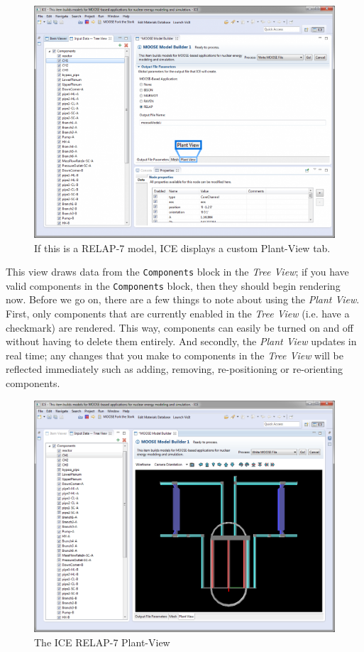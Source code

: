 \begin{figure}[htbp]
\centering
\includegraphics[width=\textwidth]{figures/ICE_MOOSEPlantViewTab.png}
\caption{If this is a RELAP-7 model, ICE displays a custom Plant-View tab.}
\end{figure}

This view draws data from the \texttt{Components} block in the
\emph{Tree View}; if you have valid components in the
\texttt{Components} block, then they should begin rendering now. Before
we go on, there are a few things to note about using the \emph{Plant
View}. First, only components that are currently enabled in the
\emph{Tree View} (i.e. have a checkmark) are rendered. This way,
components can easily be turned on and off without having to delete them
entirely. And secondly, the \emph{Plant View} updates in real time; any
changes that you make to components in the \emph{Tree View} will be
reflected immediately such as adding, removing, re-positioning or
re-orienting components.

\begin{figure}[htbp]
\centering
\includegraphics[width=\textwidth]{figures/ICE_MOOSEPlantView.png}
\caption{The ICE RELAP-7 Plant-View}
\end{figure}

